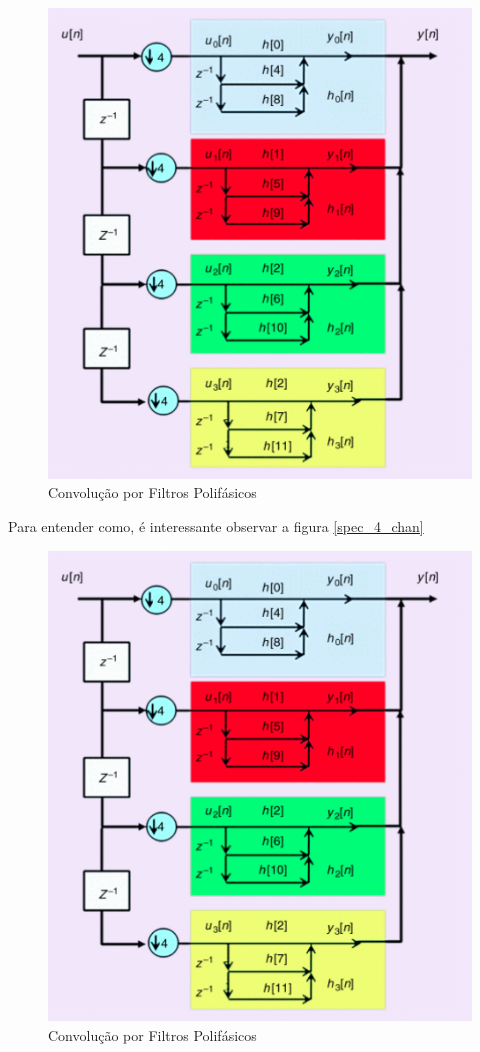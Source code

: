\begin{figure}[h!]
\centering
\includegraphics[width=4.5in]{filtro_down.png}
\caption{Convolução por Filtros Polifásicos \cite{Krishna}}
\label{polifase2}
\end{figure} 

Para entender como, é interessante observar a figura \ref{spec_4_chan}

\begin{figure}[h!]
\centering
\includegraphics[width=4.5in]{filtro_down.png}
\caption{Convolução por Filtros Polifásicos \cite{Krishna}}
\label{polifase3}
\end{figure} 


